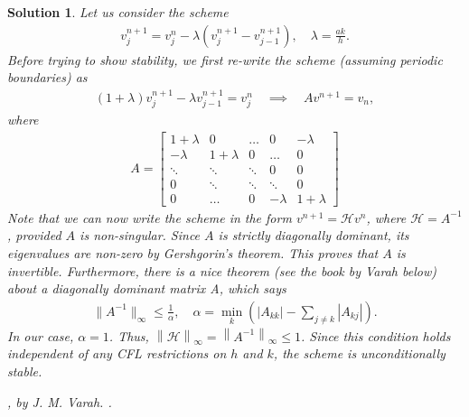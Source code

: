 \documentclass[10pt,letterpaper]{article}
\newcommand{\rb}[1]{ \left(  {#1} \right) }
\newcommand{\norm}[1]{ \left\|  {#1} \right\| }
\theoremstyle{break}
\newtheorem{mysolution}{Solution}
\newenvironment{solution}{\begin{mysolution}}{\end{mysolution}}
\begin{document}
\begin{solution}
	Let us consider the scheme
	\begin{gather} \label{implicit} 	
		v_j^{n+1}=v_j^n -\lambda \rb{v_{j}^{n+1} -v_{j-1}^{n+1}}, \quad \lambda = \frac{ak}{h}. 
	\end{gather} 
	Before trying to show stability, we first re-write the scheme (assuming periodic boundaries) as 
	\begin{gather} \label{implicit_1} 	
		\rb{1 + \lambda} v_{j}^{n+1} -\lambda v_{j-1}^{n+1} =v_j^n \quad \implies \quad A v^{n+1} = v_n,
	\end{gather} 
	where 
	\begin{gather}
	A = \begin{bmatrix}
	1+\lambda & 0 & \dots & 0 & -\lambda \\
	-\lambda & 1+\lambda & 0 & \dots & 0 \\
	\ddots & \ddots & \ddots & 0 & 0\\
	0 & \ddots & \ddots & \ddots & 0 \\
	0 & \dots & 0 & -\lambda & 1 + \lambda
	\end{bmatrix}
	\end{gather}
	Note that we can now write the scheme in the form $v^{n+1} = \mathcal{H} v^n$, where $\mathcal{H} = A^{-1}$, 
	provided $A$ is non-singular. Since $A$ is strictly diagonally dominant, its eigenvalues are non-zero by Gershgorin's theorem.
	This proves that $A$ is invertible. Furthermore, there is a nice theorem (see the book by Varah below) about a diagonally dominant matrix A,
	which says 
	\begin{gather}
	\|A^{-1}\|_\infty \leq \frac{1}{\alpha}, \quad \alpha = \min_k\left(|A_{kk}| - \sum_{j\neq k} |A_{kj}| \right).
	\end{gather}
	In our case, $\alpha = 1$. Thus, $\norm{\mathcal{H}}_\infty = \norm{A^{-1}}_\infty \leq 1$.
	Since this condition holds independent of any CFL restrictions on $h$ and $k$, the scheme is unconditionally stable.
	
	\begin{thebibliography}{----}

		, by J. M. Varah.
		.
		
	\end{thebibliography}
\end{solution}
\end{document}
